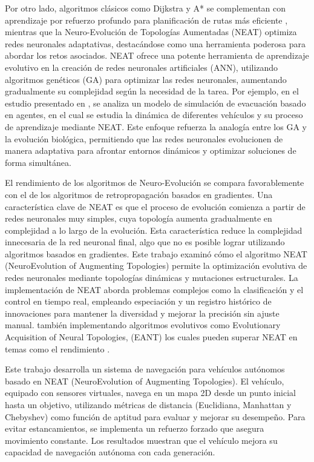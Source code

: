 \documentclass[lettersize, journal]{IEEEtran}
\begin{document}
Por otro lado, algoritmos clásicos como Dijkstra y A* se complementan con aprendizaje por refuerzo profundo para planificación de rutas más eficiente \cite{Smart_Agent,Reinfor_Control,traffic_lights,A_dqn}, mientras que la Neuro-Evolución de Topologías Aumentadas (NEAT) optimiza redes neuronales adaptativas, destacándose como una herramienta poderosa para abordar los retos asociados. NEAT ofrece una potente herramienta de aprendizaje evolutivo en la creación de redes neuronales artificiales (ANN), utilizando algoritmos genéticos (GA) para optimizar las redes neuronales, aumentando gradualmente su complejidad según la necesidad de la tarea. Por ejemplo, en el estudio presentado en \cite{NEAT}, se analiza un modelo de simulación de evacuación basado en agentes, en el cual se estudia la dinámica de diferentes vehículos y su proceso de aprendizaje mediante NEAT. Este enfoque refuerza la analogía entre los GA y la evolución biológica, permitiendo que las redes neuronales evolucionen de manera adaptativa para afrontar entornos dinámicos y optimizar soluciones de forma simultánea.

El rendimiento de los algoritmos de Neuro-Evolución se compara favorablemente con el de los algoritmos de retropropagación basados en gradientes. Una característica clave de NEAT es que el proceso de evolución comienza a partir de redes neuronales muy simples, cuya topología aumenta gradualmente en complejidad a lo largo de la evolución\cite{NEAT_2}. Esta característica reduce la complejidad innecesaria de la red neuronal final, algo que no es posible lograr utilizando algoritmos basados en gradientes.
Este trabajo examinó cómo el algoritmo NEAT (NeuroEvolution of Augmenting Topologies) permite la optimización evolutiva de redes neuronales mediante topologías dinámicas y mutaciones estructurales. La implementación de NEAT aborda problemas complejos como la clasificación y el control en tiempo real, empleando especiación y un registro histórico de innovaciones para mantener la diversidad y mejorar la precisión sin ajuste manual. también implementando  algoritmos evolutivos como Evolutionary Acquisition of Neural Topologies, (EANT) los cuales pueden superar NEAT en temas  como el rendimiento \cite{NAT_R}.

Este trabajo desarrolla un sistema de navegación para vehículos autónomos basado en NEAT (NeuroEvolution of Augmenting Topologies). El vehículo, equipado con sensores virtuales, navega en un mapa 2D desde un punto inicial hasta un objetivo, utilizando métricas de distancia (Euclidiana, Manhattan y Chebyshev) como función de aptitud para evaluar y mejorar su desempeño. Para evitar estancamientos, se implementa un refuerzo forzado que asegura movimiento constante. Los resultados muestran que el vehículo mejora su capacidad de navegación autónoma con cada generación.
\end{document}
